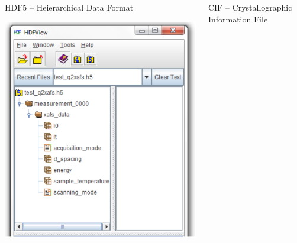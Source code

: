\documentclass[final]{beamer}
\begin{document}
\begin{frame}{}
    \begin{columns}[t]
      \begin{column}{.32\linewidth}
        \begin{block}{HDF5 -- Heierarchical Data Format}

        {\centering
          \includegraphics[height=0.8\linewidth]{hdf5.png}
        }
        
        
        \end{block}
      \end{column}
      \begin{column}{.32\linewidth}
        \begin{block}{CIF -- Crystallographic Information File}


\end{block}
\end{column}
\end{columns}
\end{frame}
\end{document}
